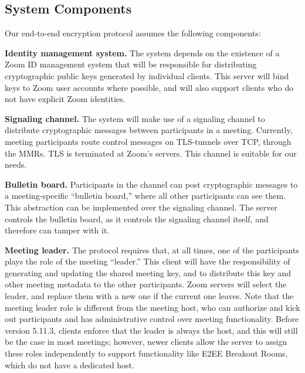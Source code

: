 \subsection{System Components}
\label{subsec:comp}

Our end-to-end encryption protocol assumes the following components:
\begin{description}
\item {\bf Identity management system.} The system depends on the existence of a Zoom ID management
system that will be responsible for distributing cryptographic public keys generated by individual
clients. This server will bind keys to Zoom user accounts where possible, and will also support
clients who do not have explicit Zoom identities.

\item {\bf Signaling channel.} The system will make use of a signaling channel to distribute
cryptographic messages between participants in a meeting. Currently, meeting participants route
control messages on TLS-tunnels over TCP, through the MMRs. TLS is terminated at Zoom's servers.
This channel is suitable for our needs.

\item {\bf Bulletin board.} Participants in the channel can post cryptographic messages to a
meeting-specific ``bulletin board,'' where all other participants can see them. This abstraction can
be implemented over the signaling channel. The server controls the bulletin board, as it controls
the signaling channel itself, and therefore can tamper with it.

\item {\bf Meeting leader.} The protocol requires that, at all times, one of the participants plays
the role of the meeting ``leader.'' This client will have the responsibility of generating and
updating the shared meeting key, and to distribute this key and other meeting metadata to the other
participants. Zoom servers will select the leader, and replace them with a new one if the current
one leaves. Note that the meeting leader role is different from the meeting host, who can authorize
and kick out participants and has administrative control over meeting functionality. Before version
5.11.3, clients enforce that the leader is always the host, and this will still be the case in most
meetings; however, newer clients allow the server to assign these roles independently to support
functionality like E2EE Breakout Rooms, which do not have a dedicated host.

\end{description}


